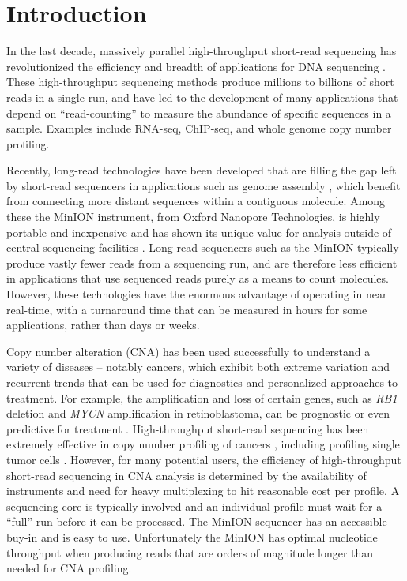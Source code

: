 \chapter{Introduction}
\label{ch1}

In the last decade, massively parallel high-throughput short-read
sequencing has revolutionized the efficiency and breadth of applications
for DNA sequencing \citep{kircher2010high}.  These high-throughput
sequencing methods produce millions to billions of short reads in a
single run, and have led to the development of many applications that
depend on ``read-counting'' to measure the abundance of specific
sequences in a sample. Examples include RNA-seq, ChIP-seq, and whole
genome copy number profiling.

Recently, long-read technologies have been developed that are filling
the gap left by short-read sequencers in applications such as genome
assembly \citep{jain2018nanopore,loman2015complete}, which benefit from
connecting more distant sequences within a contiguous molecule. Among
these the MinION instrument, from Oxford Nanopore Technologies, is
highly portable and inexpensive and has shown its unique value for
analysis outside of central sequencing facilities \citep{quick2016real}.
Long-read sequencers such as the MinION typically produce vastly fewer
reads from a sequencing run, and are therefore less efficient in
applications that use sequenced reads purely as a means to count
molecules. However, these technologies have the enormous advantage of
operating in near real-time, with a turnaround time that can be measured
in hours for some applications, rather than days or weeks.

Copy number alteration (CNA) has been used successfully to understand a
variety of diseases \citep{fanciulli2010gene} -- notably cancers, which
exhibit both extreme variation and recurrent trends that can be used for
diagnostics and personalized approaches to treatment. For example, the
amplification and loss of certain genes, such as \textit{RB1} deletion
and \textit{MYCN} amplification in retinoblastoma, can be prognostic or
even predictive for treatment \citep{berry2017potential}.
High-throughput short-read sequencing has been extremely effective in
copy number profiling of cancers \citep{chiang2009high}, including
profiling single tumor cells \citep{navin2011tumour}. However, for many
potential users, the efficiency of high-throughput short-read sequencing
in CNA analysis is determined by the availability of instruments and
need for heavy multiplexing to hit reasonable cost per profile. A
sequencing core is typically involved and an individual profile must
wait for a ``full'' run before it can be processed. The MinION sequencer
has an accessible buy-in and is easy to use. Unfortunately the MinION
has optimal nucleotide throughput when producing reads that are orders
of magnitude longer than needed for CNA profiling.

